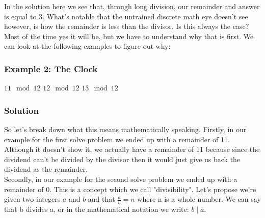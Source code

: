 \indent \indent In the solution here we see that, through long division, our remainder and answer is equal to 3. What's notable that the untrained discrete math eye doesn't see however, is how the remainder is less than the divisor. Is this always the case? Most of the time yes it will be, but we have to understand why that is first. We can look at the following examples to figure out why:
\subsubsection*{Example 2: The Clock}

\begin{center}
     $11 \mod{12}$ \hfill {} $12 \mod{12}$ \hfill {} $13 \mod{12}$
\end{center}

\subsubsection*{Solution}
\begin{center}
     \hfill {} \hfill {}
\end{center}

\indent \indent So let's break down what this means mathematically speaking. Firstly, in our example for the first solve problem we ended up with a remainder of 11. Although it doesn't show it, we actually have a remainder of 11 because since the dividend can't be divided by the divisor then it would just give us back the dividend as the remainder. \\ 
\indent \indent Secondly, in our example for the second solve problem we ended up with a remainder of 0. This is a concept which we call "divisibility". Let's propose we're given two integers $a$ and $b$ and that $\frac{a}{b} = n$ where n is a whole number. We can say that b divides a, or in the mathematical notation we write: $b \mid a$.


